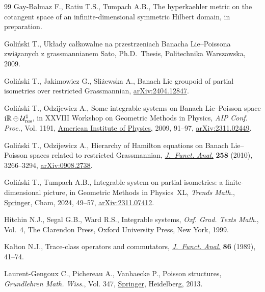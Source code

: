\documentclass[10pt,a4paper]{amsart}
\theoremstyle{definition}
\numberwithin{equation}{section}
\let\MFOriginalCedilla\c
\renewcommand{\c}[1]{{\MFcedillafont\MFOriginalCedilla{#1}}}
\begin{document}
\begin{thebibliography}{99}
Gay-Balmaz F., Ratiu T.S., Tumpach A.B., The hyperkaehler metric on the
 cotangent space of an infinite-dimensional symmetric {H}ilbert domain, in
 preparation.

Goli\'nski T., Uk{\l}ady ca{\l}kowalne na przestrzeniach {B}anacha
 {L}ie--{P}oissona zwi\c{a}zanych z grassmannianem {S}ato, Ph.D.~Thesis,
 {P}olitechnika Warszawska, 2009.

Goli\'nski T., Jakimowicz G., Sli\.{z}ewska A., Banach {L}ie groupoid of
 partial isometries over restricted {G}rassmannian, \href{https://arxiv.org/abs/2404.12847}{arXiv:2404.12847}.

Goli\'nski T., Odzijewicz A., Some integrable systems on {B}anach
 {L}ie--{P}oisson space ${\rm i}\mathbb{R}\oplus \mathcal{U}^1_{\textrm{res}}$, in
 {XXVIII} {W}orkshop on {G}eometric {M}ethods in {P}hysics, \textit{AIP Conf.
 Proc.}, Vol. 1191, \href{https://doi.org/10.1063/1.3275603}{American Institute of Physics}, 2009, 91--97,
 \href{https://arxiv.org/abs/2311.02449}{arXiv:2311.02449}.

Goli\'nski T., Odzijewicz A., Hierarchy of {H}amilton equations on {B}anach
 {L}ie--{P}oisson spaces related to restricted {G}rassmannian,
 \href{https://doi.org/10.1016/j.jfa.2010.01.019}{\textit{J.~Funct. Anal.}} \textbf{258} (2010), 3266--3294, \href{https://arxiv.org/abs/0908.2738}{arXiv:0908.2738}.

Goli\'nski T., Tumpach A.B., Integrable system on partial isometries: a
 finite-dimensional picture, in Geometric {M}ethods in {P}hysics~{XL}, \textit{Trends Math.}, \href{https://doi.org/10.1007/978-3-031-62407-0_5}{Springer}, Cham, 2024, 49--57, \href{https://arxiv.org/abs/2311.07412}{arXiv:2311.07412}.

Hitchin N.J., Segal G.B., Ward R.S., Integrable systems, \textit{Oxf. Grad.
 Texts Math.}, Vol.~4, The Clarendon Press, Oxford University Press, New York,
 1999.

Kalton N.J., Trace-class operators and commutators, \href{https://doi.org/10.1016/0022-1236(89)90064-5}{\textit{J.~Funct. Anal.}}
 \textbf{86} (1989), 41--74.

Laurent-Gengoux C., Pichereau A., Vanhaecke P., Poisson structures,
 \textit{Grundlehren Math. Wiss.}, Vol. 347, \href{https://doi.org/10.1007/978-3-642-31090-4}{Springer}, Heidelberg, 2013.


\end{thebibliography}
\end{document}
